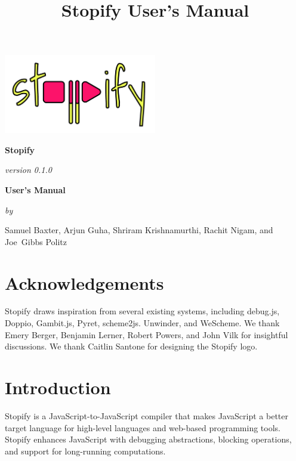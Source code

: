 \documentclass[10pt]{book}
\begin{document}
\title{Stopify User's Manual}

\begin{titlepage}
\centering

\includegraphics[width=0.5\textwidth]{logo.png}\par\vspace{1cm}

{\Huge\bfseries Stopify}

\vspace{0.25in}

{\itshape version 0.1.0}

\vspace{0.5in}

{\Large\bfseries User's Manual}

\vspace{1in}

{\itshape by}

\vspace{0.25in}

Samuel Baxter, Arjun Guha, Shriram Krishnamurthi, Rachit Nigam, and Joe~Gibbs Politz
\vfill
\end{titlepage}


\tableofcontents

\chapter{Acknowledgements}

Stopify draws inspiration from several existing systems, including debug.js,
Doppio, Gambit.js, Pyret, scheme2js. Unwinder, and WeScheme. We thank Emery
Berger, Benjamin Lerner, Robert Powers, and John Vilk for insightful
discussions. We thank Caitlin Santone for designing the Stopify logo.


\chapter{Introduction}

Stopify is a JavaScript-to-JavaScript compiler that makes JavaScript a better
target language for high-level languages and web-based programming tools.
Stopify enhances JavaScript with debugging abstractions, blocking operations,
and support for long-running computations.
\end{document}
